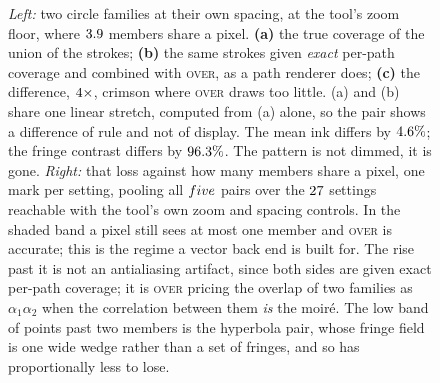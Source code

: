 \begin{figure}[t]
  \caption{
  \emph{Left:} two circle families at their own spacing, at the tool's zoom floor,
  where $3.9$ members share a pixel. \textbf{(a)} the true coverage of
  the union of the strokes; \textbf{(b)} the same strokes given \emph{exact}
  per-path coverage and combined with \textsc{over}, as a path renderer does;
  \textbf{(c)} the difference, $4\times$, crimson where \textsc{over}
  draws too little. (a) and (b) share one linear stretch, computed from (a) alone,
  so the pair shows a difference of rule and not of display. The mean ink differs
  by $4.6\%$; the fringe contrast differs by $96.3\%$. The
  pattern is not dimmed, it is gone.
  \emph{Right:} that loss against how many members share a pixel, one mark per
  setting, pooling all $five{}$ pairs over the $27$ settings
  reachable with the tool's own zoom and spacing controls. In the shaded band a
  pixel still sees at most one member and \textsc{over} is accurate; this is the
  regime a vector back end is built for. The rise past it is not an antialiasing
  artifact, since both sides are given exact per-path coverage; it is
  \textsc{over} pricing the overlap of two families as $\alpha_1\alpha_2$ when the
  correlation between them \emph{is} the moir\'e. The low band of points past two
  members is the hyperbola pair, whose fringe field is one wide wedge rather than a
  set of fringes, and so has proportionally less to lose.}
  \label{fig:vector}
\end{figure}

